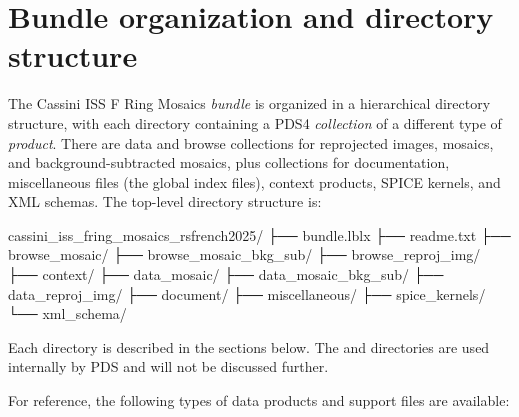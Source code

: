 
\section{Bundle organization and directory structure}
\label{sec:bundle-organization-and-directory-structure}

The Cassini ISS F Ring Mosaics \textit{bundle} is organized in a hierarchical directory structure, with each directory containing a PDS4 \textit{collection} of a different type of \textit{product}. There are data and browse collections for reprojected images, mosaics, and background-subtracted mosaics, plus collections for documentation, miscellaneous files (the global index files), context products, SPICE kernels, and XML schemas. The top-level directory structure is:

\begin{CodeBlock}
cassini_iss_fring_mosaics_rsfrench2025/
├── bundle.lblx
├── readme.txt
├── browse_mosaic/
├── browse_mosaic_bkg_sub/
├── browse_reproj_img/
├── context/
├── data_mosaic/
├── data_mosaic_bkg_sub/
├── data_reproj_img/
├── document/
├── miscellaneous/
├── spice_kernels/
└── xml_schema/
\end{CodeBlock}

Each directory is described in the sections below. The  and  directories are used internally by PDS and will not be discussed further.

For reference, the following types of data products and support files are available:

